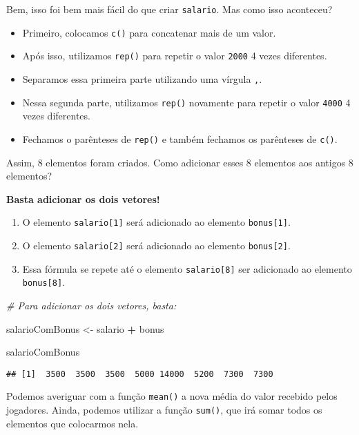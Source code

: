 \documentclass[
]{article}
\newenvironment{Shaded}{\begin{snugshade}}{\end{snugshade}}
\newcommand{\CommentTok}[1]{\textcolor[rgb]{0.56,0.35,0.01}{\textit{#1}}}
\newcommand{\NormalTok}[1]{#1}
\newcommand{\OperatorTok}[1]{\textcolor[rgb]{0.81,0.36,0.00}{\textbf{#1}}}
\newcommand{\StringTok}[1]{\textcolor[rgb]{0.31,0.60,0.02}{#1}}
\providecommand{\tightlist}{%
  \setlength{\itemsep}{0pt}\setlength{\parskip}{0pt}}
\begin{document}
Bem, isso foi bem mais fácil do que criar \texttt{salario}. Mas como
isso aconteceu?

\begin{itemize}
\tightlist
\item
  Primeiro, colocamos \texttt{c()} para concatenar mais de um valor.
\item
  Após isso, utilizamos \texttt{rep()} para repetir o valor
  \texttt{2000} 4 vezes diferentes.
\item
  Separamos essa primeira parte utilizando uma vírgula \texttt{,}.
\item
  Nessa segunda parte, utilizamos \texttt{rep()} novamente para repetir
  o valor \texttt{4000} 4 vezes diferentes.
\item
  Fechamos o parênteses de \texttt{rep()} e também fechamos os
  parênteses de \texttt{c()}.
\end{itemize}

Assim, 8 elementos foram criados. Como adicionar esses 8 elementos aos
antigos 8 elementos?

\textbf{Basta adicionar os dois vetores!}

\begin{enumerate}
\def\labelenumi{\arabic{enumi}.}
\item
  O elemento \texttt{salario{[}1{]}} será adicionado ao elemento
  \texttt{bonus{[}1{]}}.
\item
  O elemento \texttt{salario{[}2{]}} será adicionado ao elemento
  \texttt{bonus{[}2{]}}.
\item
  Essa fórmula se repete até o elemento \texttt{salario{[}8{]}} ser
  adicionado ao elemento \texttt{bonus{[}8{]}}.
\end{enumerate}

\begin{Shaded}
\begin{Highlighting}[]
\CommentTok{# Para adicionar os dois vetores, basta:}

\NormalTok{salarioComBonus <-}\StringTok{ }\NormalTok{salario }\OperatorTok{+}\StringTok{ }\NormalTok{bonus}

\NormalTok{salarioComBonus}
\end{Highlighting}
\end{Shaded}

\begin{verbatim}
## [1]  3500  3500  3500  5000 14000  5200  7300  7300
\end{verbatim}

Podemos averiguar com a função \texttt{mean()} a nova média do valor
recebido pelos jogadores. Ainda, podemos utilizar a função
\texttt{sum()}, que irá somar todos os elementos que colocarmos nela.
\end{document}
